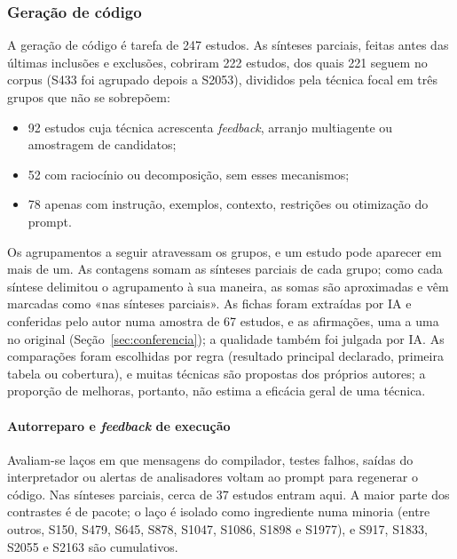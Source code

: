 \subsubsection{Geração de código}

A geração de código é tarefa de 247 estudos. As sínteses parciais, feitas antes das últimas inclusões e exclusões,
cobriram 222 estudos, dos quais 221 seguem no corpus (S433 foi agrupado depois a S2053), divididos pela técnica focal em três grupos que não se sobrepõem:
\begin{itemize}
\item 92 estudos cuja técnica acrescenta \textit{feedback}, arranjo multiagente ou amostragem de candidatos;
\item 52 com raciocínio ou decomposição, sem esses mecanismos;
\item 78 apenas com instrução, exemplos, contexto, restrições ou otimização do prompt.
\end{itemize}

Os agrupamentos a seguir atravessam os grupos, e um estudo pode aparecer em mais de um. As contagens somam as sínteses parciais de cada grupo; como cada síntese delimitou o agrupamento à sua maneira, as somas são aproximadas e vêm marcadas como «nas sínteses parciais». As fichas foram extraídas por IA e conferidas pelo autor numa amostra de 67 estudos, e as afirmações, uma a uma no original (Seção~\ref{sec:conferencia}); a qualidade também foi julgada por IA. As comparações foram escolhidas por regra (resultado principal declarado, primeira tabela ou cobertura), e muitas técnicas são propostas dos próprios autores; a proporção de melhoras, portanto, não estima a eficácia geral de uma técnica.

\paragraph{Autorreparo e \textit{feedback} de execução}
Avaliam-se laços em que mensagens do compilador, testes falhos, saídas do interpretador ou alertas de analisadores voltam ao prompt para regenerar o código. Nas sínteses parciais, cerca de 37 estudos entram aqui. A maior parte dos contrastes é de pacote; o laço é isolado como ingrediente numa minoria (entre outros, S150, S479, S645, S878, S1047, S1086, S1898 e S1977), e S917, S1833, S2055 e S2163 são cumulativos.

